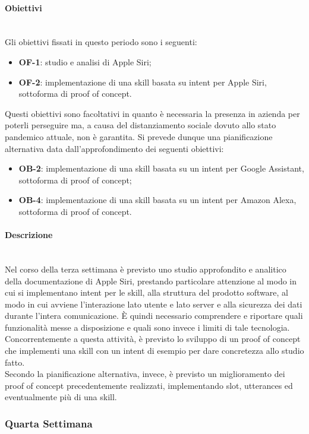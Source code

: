{		\paragraph*{Obiettivi} \mbox{}\\ [1mm]
		Gli obiettivi fissati in questo periodo sono i seguenti:
		\begin{itemize}
			\item \textbf{OF-1}: studio e analisi di Apple Siri;
			\item \textbf{OF-2}: implementazione di una skill basata su intent per Apple Siri, sottoforma di proof of concept.
		\end{itemize}
		Questi obiettivi sono facoltativi in quanto è necessaria la presenza in azienda per poterli perseguire ma, a causa del distanziamento sociale dovuto allo stato pandemico attuale, non è garantita. Si prevede dunque una pianificazione alternativa data dall'approfondimento dei seguenti obiettivi:
		\begin{itemize}
			\item \textbf{OB-2}: implementazione di una skill basata su un intent per Google Assistant, sottoforma di proof of concept;
			\item \textbf{OB-4}: implementazione di una skill basata su un intent per Amazon Alexa, sottoforma di proof of concept.
		\end{itemize}
		\paragraph*{Descrizione} \mbox{}\\ [1mm]
		Nel corso della terza settimana è previsto uno studio approfondito e analitico della documentazione di Apple Siri, prestando particolare attenzione al modo in cui si implementano intent per le skill, alla struttura del prodotto software, al modo in cui avviene l'interazione lato utente e lato server e alla sicurezza dei dati durante l'intera comunicazione. È quindi necessario comprendere e riportare quali funzionalità messe a disposizione e quali sono invece i limiti di tale tecnologia. \\
		Concorrentemente a questa attività, è previsto lo sviluppo di un proof of concept che implementi una skill con un intent di esempio per dare concretezza allo studio fatto. \\
		Secondo la pianificazione alternativa, invece, è previsto un miglioramento dei proof of concept precedentemente realizzati, implementando slot, utterances ed eventualmente più di una skill.
    \subsubsection{Quarta Settimana}
}
